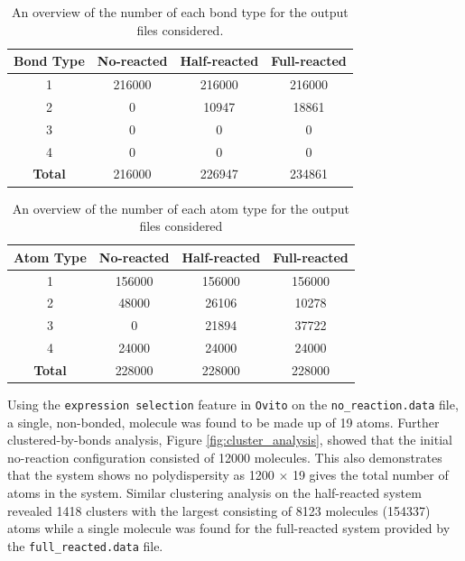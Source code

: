\documentclass[10pt,a4paper]{labreport}
\begin{document}
\begin{enumerate}
  \begin{table}[h]
    \caption{An overview of the number of each bond type for the output files considered.}
    \label{tab:ass1_lammps-bonds}
    \centering
    \begin{tabular}{cccc}
      \hline
    \textbf{Bond Type}      & \textbf{No-reacted}     & \textbf{Half-reacted}   & \textbf{Full-reacted}   \\
    \hline
    1 & 216000 & 216000 & 216000 \\
    2 & 0      & 10947  & 18861  \\
    3 & 0      & 0      & 0      \\
    4 & 0      & 0      & 0      \\ \hline
    \textbf{Total} & 216000 & 226947 & 234861 \\ \hline
    \end{tabular}
  \end{table}

  \begin{table}[h]
    \caption{An overview of the number of each atom type for the output files considered }
    \label{tab:ass1_lammps-atoms}
    \centering
    \begin{tabular}{cccc}
      \hline
    \textbf{Atom Type}      & \textbf{No-reacted}     & \textbf{Half-reacted}   & \textbf{Full-reacted}   \\
    \hline
    1 & 156000 & 156000 & 156000 \\
    2 & 48000  & 26106  & 10278  \\
    3 & 0      & 21894  & 37722  \\
    4 & 24000  & 24000  & 24000  \\ \hline
    \textbf{Total} & 228000 & 228000 & 228000 \\ \hline
    \end{tabular}
  \end{table}
  
  Using the \texttt{expression selection} feature in \texttt{Ovito} on the \texttt{no\_reaction.data} file, a single, non-bonded, molecule was found to be made up of 19 atoms. Further clustered-by-bonds analysis, Figure \ref{fig:cluster_analysis}, showed that the initial no-reaction configuration consisted of 12000 molecules. This also demonstrates that the system shows no polydispersity as 1200 $\times$ 19 gives the total number of atoms in the system. Similar clustering analysis on the half-reacted system revealed 1418 clusters with the largest consisting of 8123 molecules (154337) atoms while a single molecule was found for the full-reacted system provided by the \texttt{full\_reacted.data} file. 


\end{enumerate}
\end{document}
